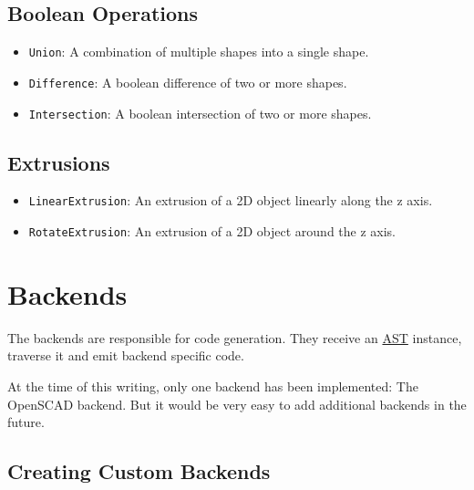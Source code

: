 \subsection{Boolean Operations}

\begin{itemize}
	\item \texttt{Union}: A combination of multiple shapes into a single shape.
	\item \texttt{Difference}: A boolean difference of two or more shapes.
	\item \texttt{Intersection}: A boolean intersection of two or more shapes.
\end{itemize}

\subsection{Extrusions}

\begin{itemize}
	\item \texttt{LinearExtrusion}: An extrusion of a 2D object linearly along the
		z axis.
	\item \texttt{RotateExtrusion}: An extrusion of a 2D object around the z axis. 
\end{itemize}


\section{Backends}\label{sec:architecture:backends}

The backends are responsible for code generation. They receive an
\hyperref[sec:architecture:ast]{AST} instance, traverse it and emit backend specific code.

At the time of this writing, only one backend has been implemented: The OpenSCAD
backend. But it would be very easy to add additional backends in the future.

\subsection{Creating Custom Backends}


